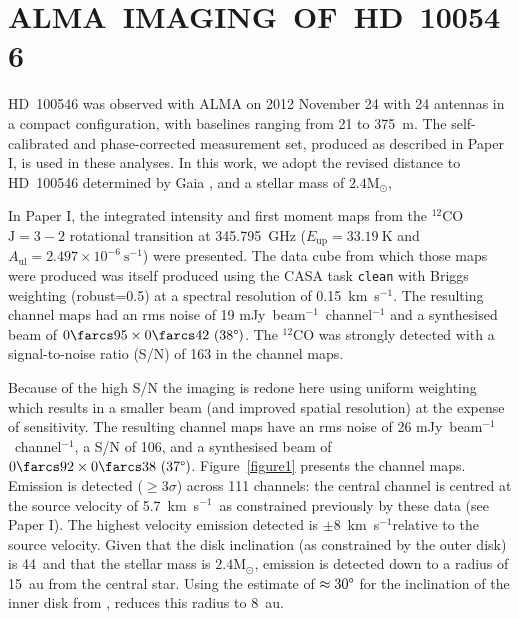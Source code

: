\documentclass[onecolumn]{aastex6}
\newcommand{\kms}{km~s$^{-1}$}
\newcommand{\perbeam}{beam$^{-1}$}
\begin{document}

\section{ALMA~IMAGING~OF~HD~100546 }
\label{almaimages}

HD~100546 was observed with ALMA on 2012 November 24 with
24 antennas in a compact configuration, with baselines
ranging from 21 to 375~m.
The self-calibrated and phase-corrected
measurement set, produced as described in Paper I,
is used in these analyses.
In this work, we adopt the revised distance to
HD~100546 determined by Gaia \citep[$109\pm4$ pc,][]{gaia16a,gaia16b},
and a stellar mass of $2.4 \mathrm{M}_{\odot}$, \citep{vandenancker98}

In Paper I, the integrated intensity
and first moment maps from the $^{12}$CO $\mathrm{J}=3-2$ rotational
transition at 345.795~GHz ($E_\mathrm{up} = 33.19~\mathrm{K}$
and $A_\mathrm{ul} = 2.497\times 10^{-6}~\mathrm{s}^{-1}$) were presented.
The data cube from which those maps were produced was itself produced
using the CASA task \texttt{clean} with Briggs weighting (robust=0.5)
at a spectral resolution of 0.15~\kms.
The resulting channel maps had an rms noise of 19 mJy~\perbeam~channel$^{-1}$
and a synthesised beam of $0\farcs95\times0\farcs42~(38\degree)$.
The $^{12}$CO was strongly detected with a signal-to-noise ratio
(S/N) of 163 in the channel maps.

Because of the high S/N the imaging is redone here
using uniform weighting which results in a smaller beam (and improved
spatial resolution) at the expense of sensitivity.
The resulting channel maps have an rms noise of 26
mJy~beam$^{-1}$~channel$^{-1}$, a S/N of 106, and
a synthesised beam of $0\farcs92\times0\farcs38~(37\degree)$.
Figure~\ref{figure1} presents the channel maps.
Emission is detected ($\ge 3\sigma$) across 111 channels: the central channel
is centred at the source velocity of 5.7~\kms~as constrained
previously by these data (see Paper I).
The highest velocity emission detected is $\pm 8$~\kms relative
to the source velocity.
Given that the disk inclination (as constrained by the outer disk)
is 44\degree~and that the stellar mass is $2.4 \mathrm{M}_\odot$,
emission is detected down to a radius of 15~au from the central star.
Using the estimate of $\approx 30\degree$ for the inclination of the
inner disk from \citet{pineda14}, reduces this radius to 8~au.
\end{document}
